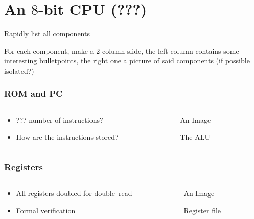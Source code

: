 \documentclass[aspectratio=169]{beamer}
\begin{document}
\section{An $8$-bit CPU (???)}
\begin{frame}
	Rapidly list all components

	For each component, make a 2-column slide, the left column contains some
	interesting bulletpoints, the right one a picture of said components (if
	possible isolated?)
\end{frame}

\begin{frame}
	\frametitle{ROM and PC}
	\begin{columns}
		\begin{column}{0.5\textwidth}
			\begin{itemize}
				\item ??? number of instructions?
				\item How are the instructions stored?
			\end{itemize}
		\end{column}
		\begin{column}{0.5\textwidth}
			\begin{figure}
				An Image
				\caption*{The ALU}
			\end{figure}
		\end{column}
	\end{columns}
\end{frame}

\begin{frame}
	\frametitle{Registers}
	\begin{columns}
		\begin{column}{0.5\textwidth}
			\begin{itemize}
				\item All registers doubled for double--read
				\item Formal verification
			\end{itemize}
		\end{column}
		\begin{column}{0.5\textwidth}
			\begin{figure}
				An Image
				\caption*{Register file}
			\end{figure}
		\end{column}
	\end{columns}
\end{frame}
\end{document}
